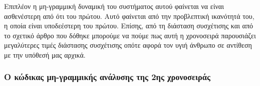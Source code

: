 \documentclass[11pt,]{article}
\begin{document}
Επιπλέον η μη-γραμμική δυναμική του συστήματος αυτού φαίνεται να είναι
ασθενέστερη από ότι του πρώτου. Αυτό φαίνεται από την προβλεπτική
ικανότητά του, η οποία είναι υποδεέστερη του πρώτου. Επίσης, από τη
διάσταση συσχέτισης και από το σχετικό άρθρο που δόθηκε μπορούμε να
πούμε πως αυτή η χρονοσειρά παρουσιάζει μεγαλύτερες τιμές διάστασης
συσχέτισης οπότε αφορά τον υγιή άνθρωπο σε αντίθεση με την υπόθεσή μας
αρχικά.

\hypertarget{ux3bf-ux3baux3ceux3b4ux3b9ux3baux3b1ux3c2-ux3bcux3b7-ux3b3ux3c1ux3b1ux3bcux3bcux3b9ux3baux3aeux3c2-ux3b1ux3bdux3acux3bbux3c5ux3c3ux3b7ux3c2-ux3c4ux3b7ux3c2-2ux3b7ux3c2-ux3c7ux3c1ux3bfux3bdux3bfux3c3ux3b5ux3b9ux3c1ux3acux3c2}{%
\subsubsection{Ο κώδικας μη-γραμμικής ανάλυσης της 2ης
χρονοσειράς}\label{ux3bf-ux3baux3ceux3b4ux3b9ux3baux3b1ux3c2-ux3bcux3b7-ux3b3ux3c1ux3b1ux3bcux3bcux3b9ux3baux3aeux3c2-ux3b1ux3bdux3acux3bbux3c5ux3c3ux3b7ux3c2-ux3c4ux3b7ux3c2-2ux3b7ux3c2-ux3c7ux3c1ux3bfux3bdux3bfux3c3ux3b5ux3b9ux3c1ux3acux3c2}}
\end{document}

